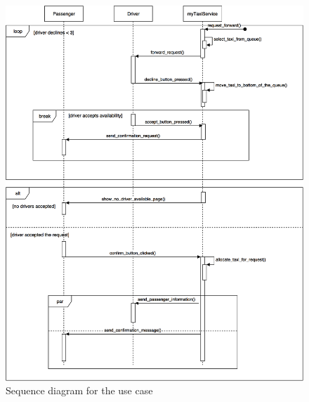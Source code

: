 \documentclass[a4paper,12pt,dvipsnames]{article}%
\begin{document}
\begin{figure}[H]
\centering
\includegraphics[scale=.3]{request_forward.png}
\caption{Sequence diagram for the use case}
\end{figure}
\break
\end{document}
